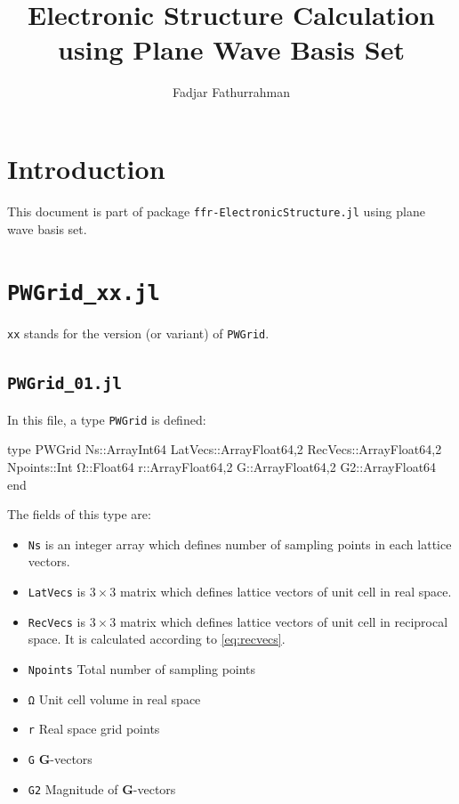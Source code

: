 \documentclass[a4paper,11pt]{extarticle}
\begin{document}
\title{Electronic Structure Calculation using Plane Wave Basis Set}
\author{Fadjar Fathurrahman}
\date{}
\maketitle

\tableofcontents

\section{Introduction}

This document is part of package
{\tt ffr-ElectronicStructure.jl} using plane wave basis set.



\section{ {\tt PWGrid\_xx.jl} }

\verb|xx| stands for the version (or variant) of \verb|PWGrid|.


\subsection{ {\tt PWGrid\_01.jl} }

In this file, a type \verb|PWGrid| is defined:
\begin{juliacode}
type PWGrid
  Ns::Array{Int64}
  LatVecs::Array{Float64,2}
  RecVecs::Array{Float64,2}
  Npoints::Int
  Ω::Float64
  r::Array{Float64,2}
  G::Array{Float64,2}
  G2::Array{Float64}
end
\end{juliacode}

The fields of this type are:
\begin{itemize}

\item {\tt Ns} is an integer array which defines number of sampling points
in each lattice vectors.

\item {\tt LatVecs} is $3\times3$ matrix which defines lattice vectors of
unit cell in real space.

\item {\tt RecVecs} is $3\times3$ matrix which defines lattice vectors of
unit cell in reciprocal space. It is calculated according to \eqref{eq:recvecs}.

\item {\tt Npoints} Total number of sampling points
\item {\tt Ω} Unit cell volume in real space
\item {\tt r} Real space grid points
\item {\tt G} \textbf{G}-vectors
\item {\tt G2} Magnitude of \textbf{G}-vectors

\end{itemize}
\end{document}
